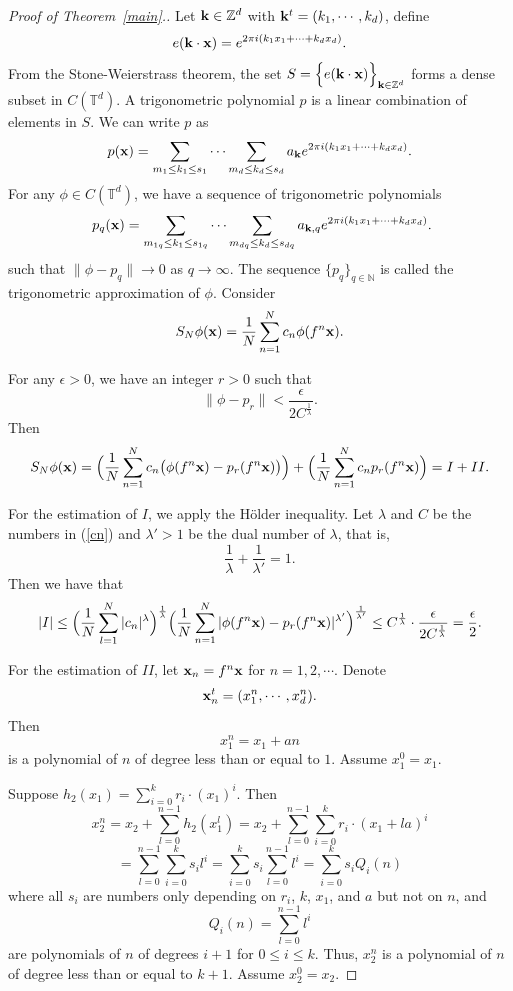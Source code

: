 \documentclass[12pt,letterpaper]{amsart}
\newcommand {\N} {{\mathbb N}}
\newcommand {\Z} {{\mathbb Z}}
\newcommand {\Td} {{\mathbb T}^{d}}
\begin{document}
\begin{proof}[Proof of Theorem~\ref{main}.]
Let ${\bf k}\in \Z^{d}$ with ${\bf k}^{t}=(k_{1}, \cdots,k_{d})$, define
$$
e({\bf k}\cdot {\bf x}) = e^{2\pi i (k_{1}x_{1}+\cdots + k_{d}x_{d})}.
$$
From the Stone-Weierstrass theorem, 
the set 
$S=\Big\{ e({\bf k}\cdot {\bf x})\Big\}_{{\bf k}\in \Z^{d}}$ 
forms a dense subset in $C(\Td)$.
A trigonometric polynomial $p$ is a linear combination of elements in $S$. We can write $p$ as 
$$
p({\bf x}) = \sum_{m_{1}\leq k_{1}\leq s_{1}}\cdots \sum_{m_{d}\leq k_{d}\leq s_{d}} a_{\bf k} e^{2\pi i (k_{1}x_{1}+\cdots +k_{d}x_{d})}.
$$
For any $\phi\in C(\Td)$, we have a sequence of trigonometric polynomials 
\begin{equation}~\label{stp}
p_{q}({\bf x}) = \sum_{m_{1q}\leq k_{1}\leq s_{1q}}\cdots \sum_{m_{dq}\leq k_{d}\leq s_{dq}} a_{{\bf k}, q} e^{2\pi i (k_{1}x_{1}+\cdots +k_{d}x_{d})}.
\end{equation}
such that $\|\phi-p_{q}\|\to 0$ as $q\to \infty$. The sequence $\{p_{q}\}_{q\in\N}$ is called the trigonometric approximation of $\phi$.
Consider
$$
S_{N}\phi ({\bf x}) = \frac{1}{N} \sum_{n=1}^{N} c_{n} \phi(f^{n} {\bf x}).
$$
 
For any $\epsilon>0$, we have an integer $r>0$ such that
$$
\| \phi-p_{r}\| <\frac{\epsilon}{2C^{\frac{1}{\lambda}}}.
$$
Then 
$$
S_{N}\phi ({\bf x}) =\Big( \frac{1}{N} \sum_{n=1}^{N} c_{n} \big( \phi(f^{n} {\bf x}) -p_{r} (f^{n} {\bf x})\big)\Big) +\Big( \frac{1}{N} \sum_{n=1}^{N} c_{n} p_{r} (f^{n} {\bf x})\Big) =I+II.
$$

For the estimation of $I$, we apply the H\"older inequality. Let $\lambda$ and $C$ be the numbers in (\ref{cn}) and $\lambda'>1$ be the dual number of $\lambda$, that is, 
$$
\frac{1}{\lambda} +\frac{1}{\lambda'}=1.
$$ 
Then we have that
$$
|I|\leq \Big( \frac{1}{N} \sum_{l=1}^{N} |c_{n}|^{\lambda}\Big)^{\frac{1}{\lambda}} 
 \Big( \frac{1}{N} \sum_{n=1}^{N} |\phi(f^{n} {\bf x})-p_{r}(f^{n} {\bf x})|^{\lambda'}\Big)^{\frac{1}{\lambda'}}
\leq C^{\frac{1}{\lambda}} \cdot \frac{\epsilon}{2C^{\frac{1}{\lambda}}} =\frac{\epsilon}{2}.
$$

For the estimation of $II$, let ${\bf x}_{n}=f^{n}{\bf x}$ for $n=1, 2,\cdots$.
Denote 
$$
{\bf x}_{n}^{t}=(x_{1}^{n},\cdots, x_{d}^{n}).
$$
Then 
$$
x_{1}^{n} = x_{1} + an
$$
is a polynomial of $n$ of degree less than or equal to $1$. Assume $x_{1}^{0}=x_{1}$. 

Suppose $h_{2} (x_{1}) = \sum_{i=0}^{k} r_{i} \cdot (x_{1})^{i}$. Then
$$
x_{2}^{n} = x_{2} +\sum_{l=0}^{n-1} h_{2}(x_{1}^{l})= x_{2}+\sum_{l=0}^{n-1} \sum_{i=0}^{k} r_{i} \cdot (x_{1}+la)^{i}
$$
$$
= \sum_{l=0}^{n-1} \sum_{i=0}^{k} s_{i} l^{i}
=\sum_{i=0}^{k} s_{i} \sum_{l=0}^{n-1} l^{i}= \sum_{i=0}^{k} s_{i} Q_{i}(n)
$$
where all $s_{i}$ are numbers only depending on $r_{i}$, $k$, $x_{1}$, and $a$ but not on $n$, and
$$
Q_{i}(n) = \sum_{l=0}^{n-1} l^{i}
$$ 
are polynomials of $n$ of degrees $i+1$ for $0\leq i\leq k$. 
Thus, $x_{2}^{n}$ is a polynomial of $n$ of degree less than or equal to $k+1$. Assume $x_{2}^{0}=x_{2}$.


\end{proof}
\end{document}
